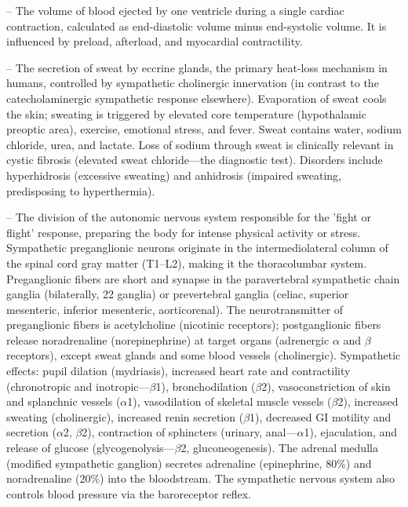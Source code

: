 -- The volume of blood ejected by one ventricle during a single cardiac contraction, calculated as end-diastolic volume minus end-systolic volume. It is influenced by preload, afterload, and myocardial contractility.

-- The secretion of sweat by eccrine glands, the primary heat-loss mechanism in humans, controlled by sympathetic cholinergic innervation (in contrast to the catecholaminergic sympathetic response elsewhere). Evaporation of sweat cools the skin; sweating is triggered by elevated core temperature (hypothalamic preoptic area), exercise, emotional stress, and fever. Sweat contains water, sodium chloride, urea, and lactate. Loss of sodium through sweat is clinically relevant in cystic fibrosis (elevated sweat chloride—the diagnostic test). Disorders include hyperhidrosis (excessive sweating) and anhidrosis (impaired sweating, predisposing to hyperthermia).

-- The division of the autonomic nervous system responsible for the 'fight or flight' response, preparing the body for intense physical activity or stress. Sympathetic preganglionic neurons originate in the intermediolateral column of the spinal cord gray matter (T1--L2), making it the thoracolumbar system. Preganglionic fibers are short and synapse in the paravertebral sympathetic chain ganglia (bilaterally, 22 ganglia) or prevertebral ganglia (celiac, superior mesenteric, inferior mesenteric, aorticorenal). The neurotransmitter of preganglionic fibers is acetylcholine (nicotinic receptors); postganglionic fibers release noradrenaline (norepinephrine) at target organs (adrenergic $\alpha$ and $\beta$ receptors), except sweat glands and some blood vessels (cholinergic). Sympathetic effects: pupil dilation (mydriasis), increased heart rate and contractility (chronotropic and inotropic—$\beta$1), bronchodilation ($\beta$2), vasoconstriction of skin and splanchnic vessels ($\alpha$1), vasodilation of skeletal muscle vessels ($\beta$2), increased sweating (cholinergic), increased renin secretion ($\beta$1), decreased GI motility and secretion ($\alpha$2, $\beta$2), contraction of sphincters (urinary, anal—$\alpha$1), ejaculation, and release of glucose (glycogenolysis—$\beta$2, gluconeogenesis). The adrenal medulla (modified sympathetic ganglion) secretes adrenaline (epinephrine, 80\%) and noradrenaline (20\%) into the bloodstream. The sympathetic nervous system also controls blood pressure via the baroreceptor reflex.

